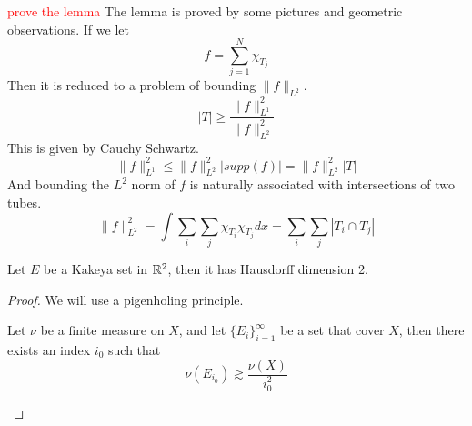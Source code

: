 \textcolor{red}{prove the lemma}
The lemma is proved by some pictures and geometric observations. If we let 
\begin{equation*}
    f=\sum_{j=1}^N\chi_{T_j}
\end{equation*}
Then it is reduced to a problem of bounding $\|f\|_{L^2}$. 
\begin{equation*}
    |T|\geq\frac{\|f\|_{L^1}^2}{\|f\|_{L^2}^2}
\end{equation*}
This is given by Cauchy Schwartz.
\begin{equation*}
    \|f\|_{L^1}^2\leq\|f\|_{L^2}^2|supp(f)|=\|f\|_{L^2}^2|T|
\end{equation*}
And bounding the $L^2$ norm of $f$ is naturally associated with intersections of two tubes.
\begin{equation*}
    \|f\|_{L^2}^2=\int \sum_i\sum_j\chi_{T_i}\chi_{T_j}dx=\sum_i\sum_j|T_i\cap T_j|
\end{equation*}

\begin{theorem}
    Let $E$ be a Kakeya set in $\mathbb{R}^2$, then it has Hausdorff dimension 2.
\end{theorem}
\begin{proof}
    We will use a pigenholing principle. 
    \begin{lemma}
        Let $\nu$ be a finite measure on $X$, and let $\{E_i\}_{i=1}^\infty$ be a set that cover $X$, then there exists an index $i_0$ such that 
        \begin{equation*}
            \nu(E_{i_0})\gtrsim\frac{\nu(X)}{i_0^2}
        \end{equation*}
    \end{lemma}
    
\end{proof}